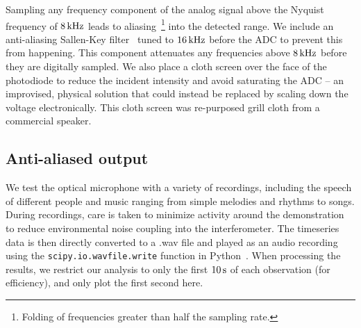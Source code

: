 \documentclass[paper-main.tex]{subfiles}
\begin{document}
Sampling any frequency component of the analog signal above the Nyquist frequency of $8\,{\rm kHz}$ leads to aliasing~\footnote{Folding of frequencies greater than half the sampling rate.} into the detected range. We include an anti-aliasing Sallen-Key filter~\cite{sallen_key_filter} tuned to $16\,{\rm kHz}$ before the ADC to prevent this from happening.
This component attenuates any frequencies above $8\,{\rm kHz}$ before they are digitally sampled. We also place a cloth screen over the face of the photodiode to reduce the incident intensity and avoid saturating the ADC -- an improvised, physical solution that could instead be replaced by scaling down the voltage electronically. This cloth screen was re-purposed grill cloth from a commercial speaker.


\subsection{Anti-aliased output}
\label{sec:initialResultsOpMic}

We test the optical microphone with a variety of recordings, including the speech of different people and music ranging from simple melodies and rhythms to songs. 
During recordings, care is taken to minimize activity around the demonstration to reduce environmental noise coupling into the interferometer. 
The timeseries data is then directly converted to a .wav file and played as an audio recording using the \texttt{scipy.io.wavfile.write} function in Python~\cite{scipy,python}. 
When processing the results, we restrict our analysis to only the first $10\,{\rm s}$ of each observation (for efficiency), and only plot the first second here. 
\end{document}

